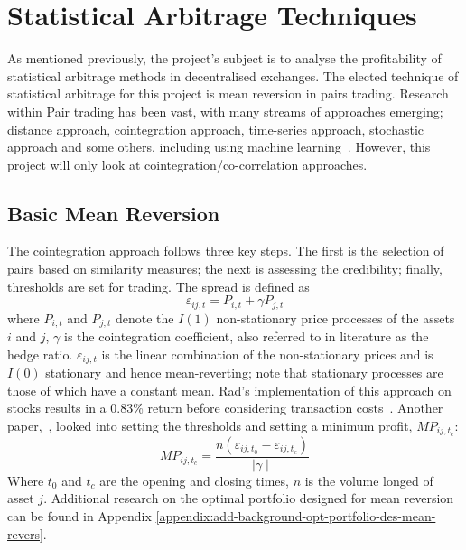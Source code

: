 \section{Statistical Arbitrage Techniques}
As mentioned previously, the project's subject is to analyse the profitability of statistical arbitrage methods in decentralised exchanges. The elected technique of statistical arbitrage for this project is mean reversion in pairs trading. Research within Pair trading has been vast, with many streams of approaches emerging; distance approach, cointegration approach, time-series approach, stochastic approach and some others, including using machine learning~\cite{https://doi.org/10.1111/joes.12153}. However, this project will only look at cointegration/co-correlation approaches.

\subsection{Basic Mean Reversion}
The cointegration approach follows three key steps. The first is the selection of pairs based on similarity measures; the next is assessing the credibility; finally, thresholds are set for trading. The spread is defined as $$\varepsilon_{i j,t} = P_{i,t} + \gamma P_{j,t}$$ where $P_{i,t}$ and $P_{j,t}$ denote the $I(1)$ non-stationary price processes of the assets $i$ and $j$, $\gamma$ is the cointegration coefficient, also referred to in literature as the hedge ratio. $\varepsilon_{i j,t}$ is the linear combination of the non-stationary prices and is $I(0)$ stationary and hence mean-reverting; note that stationary processes are those of which have a constant mean. Rad's implementation of this approach on stocks results in a 0.83\% return before considering transaction costs~\cite{RadLowFaff}. Another paper,~\cite{lossProtection}, looked into setting the thresholds and setting a minimum profit, $MP_{ij,t_c}$: $$MP_{ij,t_c} = \frac{n(\varepsilon_{i j,t_0} - \varepsilon_{i j,t_c})}{ \mid \gamma \mid}$$ Where $t_0$ and $t_c$ are the opening and closing times, $n$ is the volume longed of asset $j$. Additional research on the optimal portfolio designed for mean reversion can be found in Appendix \ref{appendix:add-background-opt-portfolio-des-mean-revers}.

